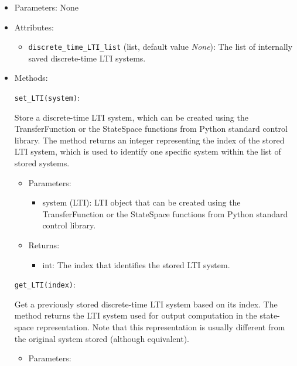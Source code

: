 \documentclass[12pt]{report}
\begin{document}
\begin{itemize}

\item Parameters: None

\item Attributes:

\begin{itemize}
\item \texttt{discrete\_time\_LTI\_list} (list, default value \emph{None}): The list of internally saved discrete-time LTI systems.
\end{itemize}

\item Methods:

\texttt{set\_LTI(system)}:

Store a discrete-time LTI system, which can be created using the TransferFunction or the StateSpace functions from Python standard control library. The method returns an integer representing the index of the stored LTI system, which is used to identify one specific system within the list of stored systems.

\begin{itemize}
\item Parameters:

\begin{itemize}
\item system (LTI): LTI object that can be created using the TransferFunction or the StateSpace functions from Python standard control library.
\end{itemize}

\item Returns:

\begin{itemize}

\item int: The index that identifies the stored LTI system.

\end{itemize}

\end{itemize}

\texttt{get\_LTI(index)}:

Get a previously stored discrete-time LTI system based on its index. The method returns the LTI system used for output computation in the state-space representation. Note that this representation is usually different from the original system stored (although equivalent).

\begin{itemize}
\item Parameters:


\end{itemize}
\end{itemize}
\end{document}
